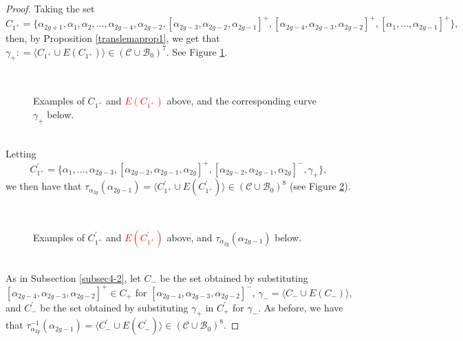 \documentclass[twoside,11pt,a4paper]{article}
\newcommand*{\Cf}{\mathscr{C}}
\newcommand*{\Bf}{\mathscr{B}}
\newcommand*{\ColonEqq}{\mathrel{\mathop:}=}
\begin{document}
\begin{proof}
 \indent Taking the set $$C_{1^{+}} = \{\alpha_{2g+1}, \alpha_{1}, \alpha_{2}, \ldots, \alpha_{2g-4}, \alpha_{2g-2}, [\alpha_{2g-3}, \alpha_{2g-2}, \alpha_{2g-1}]^{+}, [\alpha_{2g-4},\alpha_{2g-3},\alpha_{2g-2}]^{+}, [\alpha_{1}, \ldots, \alpha_{2g-1}]^{+}\},$$
 then, by Proposition \ref{translemaprop1}, we get that $\gamma_{+} \ColonEqq \langle C_{1^{+}} \cup E(C_{1^{+}})\rangle \in (\Cf \cup \Bf_{0})^{7}$. See Figure \ref{DehnTwistPuncturedFig1}.
 \begin{figure}[h]
  \begin{center}
   \resizebox{10cm}{!}{} \\[0.2cm]
   \resizebox{10cm}{!}{} \caption{Examples of $C_{1^{+}}$ and \textcolor{red}{$E(C_{1^{+}})$} above, and the corresponding curve $\gamma_{+}$ below.}\label{DehnTwistPuncturedFig1}
  \end{center}
 \end{figure}\\
 \indent Letting $$C_{1^{+}}^{\prime} = \{\alpha_{1}, \ldots, \alpha_{2g-3}, [\alpha_{2g-2},\alpha_{2g-1},\alpha_{2g}]^{+}, [\alpha_{2g-2},\alpha_{2g-1},\alpha_{2g}]^{-}, \gamma_{+}\},$$ we then have that $\tau_{\alpha_{2g}}(\alpha_{2g-1}) = \langle C_{1^{+}}^{\prime} \cup E(C_{1^{+}}^{\prime})\rangle \in (\Cf \cup \Bf_{0})^{8}$ (see Figure \ref{DehnTwistPuncturedFig3}).
 \begin{figure}[h]
  \begin{center}
   \resizebox{10cm}{!}{} \\[0.2cm]
   \resizebox{10cm}{!}{} \caption{Examples of $C^{\prime}_{1^{+}}$ and \textcolor{red}{$E(C^{\prime}_{1^{+}})$} above, and $\tau_{\alpha_{2g}}(\alpha_{2g-1})$ below.} \label{DehnTwistPuncturedFig3}
  \end{center}
 \end{figure}\\
 \indent As in Subsection \ref{subsec4-2}, let $C_{-}$ be the set obtained by substituting $[\alpha_{2g-4}, \alpha_{2g-3}, \alpha_{2g-2}]^{+} \in C_{+}$ for $[\alpha_{2g-4}, \alpha_{2g-3}, \alpha_{2g-2}]^{-}$, $\gamma_{-} = \langle C_{-} \cup E(C_{-})\rangle$, and $C_{-}^{\prime}$ be the set obtained by substituting $\gamma_{+}$ in $C_{+}^{\prime}$ for $\gamma_{-}$. As before, we have that $\tau_{\alpha_{2g}}^{-1}(\alpha_{2g-1}) = \langle C_{-}^{\prime} \cup E(C_{-}^{\prime})\rangle \in (\Cf \cup \Bf_{0})^{8}$.
\end{proof}
\end{document}
